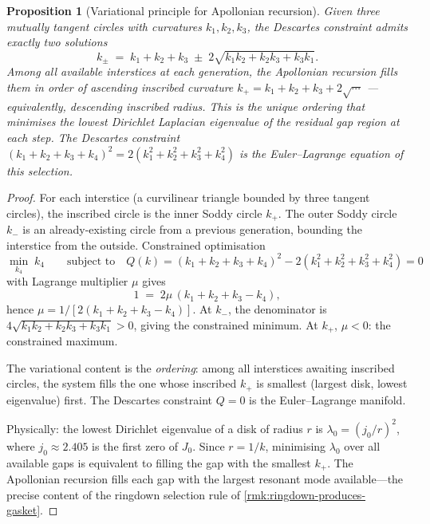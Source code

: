 \documentclass[11pt,a4paper]{article}
\theoremstyle{plain}
\newtheorem{proposition}[theorem]{Proposition}
\theoremstyle{definition}
\theoremstyle{remark}
\numberwithin{equation}{section}
\begin{document}
\begin{proposition}[Variational principle for Apollonian recursion]
\label{prop:variational-principle}
Given three mutually tangent circles with curvatures \(k_1,k_2,k_3\),
the Descartes constraint admits exactly two solutions
\[
  k_\pm \;=\; k_1{+}k_2{+}k_3 \;\pm\; 2\sqrt{k_1 k_2 + k_2 k_3 + k_3 k_1}.
\]
Among all available interstices at each generation, the Apollonian
recursion fills them in order of ascending inscribed curvature
\(k_+=k_1{+}k_2{+}k_3{+}2\sqrt{\cdots}\) — equivalently, descending
inscribed radius.  This is the unique ordering that \emph{minimises
the lowest Dirichlet Laplacian eigenvalue of the residual gap region
at each step}.  The Descartes constraint
\((k_1+k_2+k_3+k_4)^2=2(k_1^2+k_2^2+k_3^2+k_4^2)\) is the
Euler--Lagrange equation of this selection.
\end{proposition}

\begin{proof}
For each interstice (a curvilinear triangle bounded by three tangent
circles), the inscribed circle is the inner Soddy circle \(k_+\).  The
outer Soddy circle \(k_-\) is an already-existing circle from a
previous generation, bounding the interstice from the outside.
Constrained optimisation
\[
  \min_{k_4}\; k_4 \qquad \text{subject to} \quad
  Q(k) = (k_1{+}k_2{+}k_3{+}k_4)^2 - 2(k_1^2{+}k_2^2{+}k_3^2{+}k_4^2) = 0
\]
with Lagrange multiplier \(\mu\) gives
\[
  1 \;=\; 2\mu\,(k_1{+}k_2{+}k_3 - k_4),
\]
hence \(\mu = 1/[2(k_1{+}k_2{+}k_3{-}k_4)]\).  At \(k_-\), the
denominator is \(4\sqrt{k_1k_2{+}k_2k_3{+}k_3k_1}>0\), giving the
constrained minimum.  At \(k_+\), \(\mu<0\): the constrained maximum.

The variational content is the \emph{ordering}: among all interstices
awaiting inscribed circles, the system fills the one whose inscribed
\(k_+\) is smallest (largest disk, lowest eigenvalue) first.  The
Descartes constraint \(Q=0\) is the Euler--Lagrange manifold.

Physically: the lowest Dirichlet eigenvalue of a disk of radius \(r\)
is \(\lambda_0=(j_0/r)^2\), where \(j_0\approx2.405\) is the first
zero of \(J_0\).  Since \(r=1/k\), minimising \(\lambda_0\) over all
available gaps is equivalent to filling the gap with the smallest
\(k_+\).  The Apollonian recursion fills each gap with the largest
resonant mode available---the precise content of the ringdown selection
rule of \cref{rmk:ringdown-produces-gasket}.
\end{proof}
\end{document}
